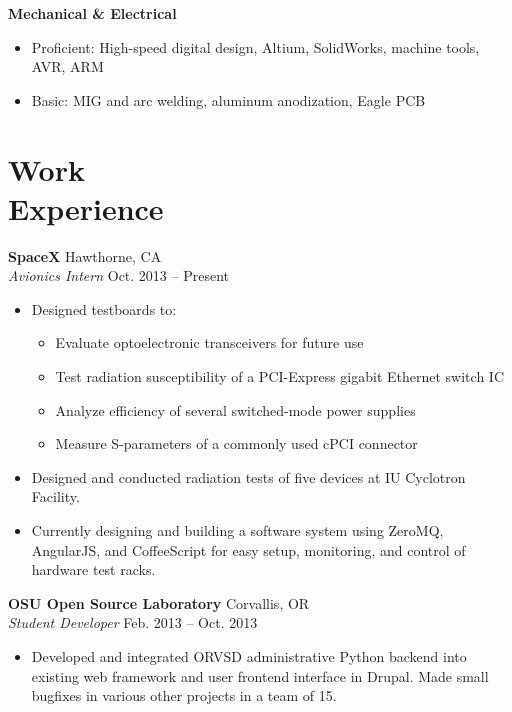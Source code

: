 \documentclass[10pt,letterpaper,margin]{res}
\begin{document}
\begin{resume}
{\bf Mechanical \& Electrical}\vspace{0.2em}

\begin{itemize}
	\item Proficient: High-speed digital design, Altium, SolidWorks, machine tools, AVR, ARM
	\item Basic: \hspace{17pt} MIG and arc welding, aluminum anodization, Eagle PCB
\end{itemize}



\section{Work \\ Experience}

{\bf SpaceX} \hfill {\color{lightgray} Hawthorne, CA} \\
{\it Avionics Intern} \hfill {\color{lightgray} Oct. 2013 -- Present}\vspace{0.2em}

\begin{itemize}
	\item Designed testboards to:
		\begin{itemize}
			\item Evaluate optoelectronic transceivers for future use
			\item Test radiation susceptibility of a PCI-Express gigabit Ethernet switch IC
			\item Analyze efficiency of several switched-mode power supplies
			\item Measure S-parameters of a commonly used cPCI connector
		\end{itemize}
	\item Designed and conducted radiation tests of five devices at IU
		Cyclotron Facility.
	\item Currently designing and building a software system using ZeroMQ,
		AngularJS, and CoffeeScript for easy setup, monitoring, and control of
		hardware test racks.
\end{itemize}


{\bf OSU Open Source Laboratory} \hfill {\color{lightgray} Corvallis, OR} \\
{\it Student Developer} \hfill {\color{lightgray} Feb. 2013 -- Oct. 2013}\vspace{0.2em}

\begin{itemize}
	\item Developed and integrated ORVSD administrative Python backend into
		existing web framework and user frontend interface in Drupal. Made
		small bugfixes in various other projects in a team of 15.
\end{itemize}



\end{resume}
\end{document}

